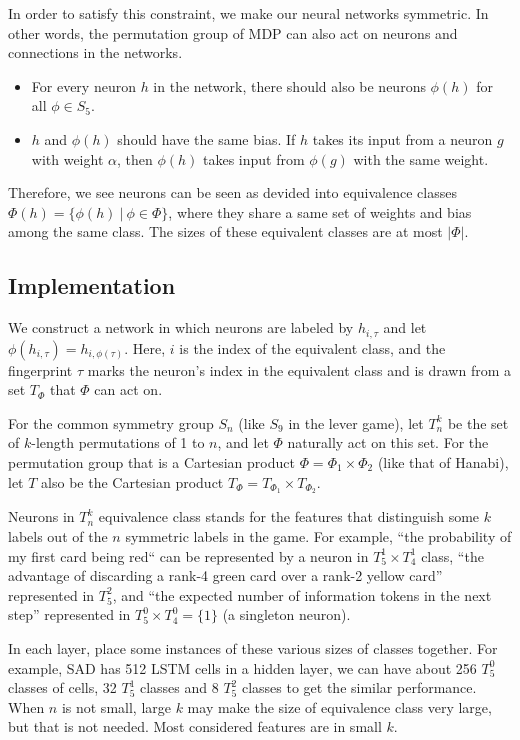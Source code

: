 \documentclass[12pt]{article}
\begin{document}
\begin{spacing}{1.15}
In order to satisfy this constraint, we make our neural networks symmetric. In other words, the permutation group of MDP can also act on neurons and connections in the networks.

\begin{itemize}
  \item For every neuron $h$ in the network, there should also be neurons $\phi(h)$ for all $\phi\in S_5$.
  \item $h$ and $\phi(h)$ should have the same bias. If $h$ takes its input from a neuron $g$ with weight $\alpha$, then $\phi(h)$ takes input from $\phi(g)$ with the same weight.
\end{itemize}

Therefore, we see neurons can be seen as devided into equivalence classes $\Phi(h) = \{\phi(h)~|~\phi\in\Phi\}$, where they share a same set of weights and bias among the same class. The sizes of these equivalent classes are at most $|\Phi|$.

\subsection{Implementation}

We construct a network in which neurons are labeled by $h_{i,\tau}$ and let $\phi(h_{i,\tau})=h_{i,\phi(\tau)}$. Here, $i$ is the index of the equivalent class, and the fingerprint $\tau$ marks the neuron's index in the equivalent class and is drawn from a set $T_\Phi$ that $\Phi$ can act on.

For the common symmetry group $S_n$ (like $S_9$ in the lever game), let $T_n^k$ be the set of $k$-length permutations of 1 to $n$, and let $\Phi$ naturally act on this set. For the permutation group that is a Cartesian product $\Phi=\Phi_1\times\Phi_2$ (like that of Hanabi), let $T$ also be the Cartesian product $T_\Phi=T_{\Phi_1}\times T_{\Phi_2}$.

Neurons in $T_n^k$ equivalence class stands for the features that distinguish some $k$ labels out of the $n$ symmetric labels in the game. For example, ``the probability of my first card being red`` can be represented by a neuron in $T_5^1\times T_4^1$ class, ``the advantage of discarding a rank-4 green card over a rank-2 yellow card'' represented in $T_5^2$, and ``the expected number of information tokens in the next step'' represented in $T_5^0\times T_4^0=\{1\}$ (a singleton neuron).

In each layer, place some instances of these various sizes of classes together. For example, SAD has 512 LSTM cells in a hidden layer, we can have about 256 $T_5^0$ classes of cells, 32 $T_5^1$ classes and 8 $T_5^2$ classes to get the similar performance. When $n$ is not small, large $k$ may make the size of equivalence class very large, but that is not needed. Most considered features are in small $k$.


\end{spacing}
\end{document}
